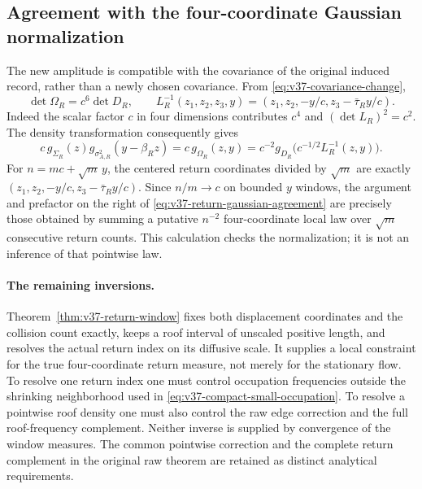 \subsection{Agreement with the four-coordinate Gaussian normalization}
The new amplitude is compatible with the covariance of the original
induced record, rather than a newly chosen covariance.
From \eqref{eq:v37-covariance-change},
\begin{equation}\label{eq:v37-return-covariance-jacobian}
 \det\Omega_R=c^6\det D_R,\qquad
 L_R^{-1}(z_1,z_2,z_3,y)
       =(z_1,z_2,-y/c,z_3-\bar\tau_R y/c).
\end{equation}
Indeed the scalar factor $c$ in four dimensions contributes $c^4$
and $(\det L_R)^2=c^2$. The density transformation consequently gives
\begin{equation}\label{eq:v37-return-gaussian-agreement}
 c\,g_{\Sigma_R}(z)g_{\sigma_{A,R}^2}(y-\beta_Rz)
   =c\,g_{\Omega_R}(z,y)
   =c^{-2}g_{D_R}\bigl(c^{-1/2}L_R^{-1}(z,y)\bigr).
\end{equation}
For $n=mc+\sqrt m\,y$, the centered return coordinates divided by
$\sqrt m$ are exactly
$(z_1,z_2,-y/c,z_3-\bar\tau_Ry/c)$.
Since $n/m\to c$ on bounded $y$ windows, the argument and prefactor
on the right of \eqref{eq:v37-return-gaussian-agreement} are precisely
those obtained by summing a putative $n^{-2}$ four-coordinate local
law over $\sqrt m$ consecutive return counts. This calculation checks
the normalization; it is not an inference of that pointwise law.

\paragraph{The remaining inversions.}
Theorem~\ref{thm:v37-return-window} fixes both displacement coordinates
and the collision count exactly, keeps a roof interval of unscaled
positive length, and resolves the actual return index on its diffusive
scale. It supplies a local constraint for the true four-coordinate
return measure, not merely for the stationary flow. To resolve one
return index one must control occupation frequencies outside the
shrinking neighborhood used in
\eqref{eq:v37-compact-small-occupation}. To resolve a pointwise roof
density one must also control the raw edge correction and the full
roof-frequency complement. Neither inverse is supplied by convergence
of the window measures. The common pointwise correction and the
complete return complement in the original raw theorem are retained
as distinct analytical requirements.
